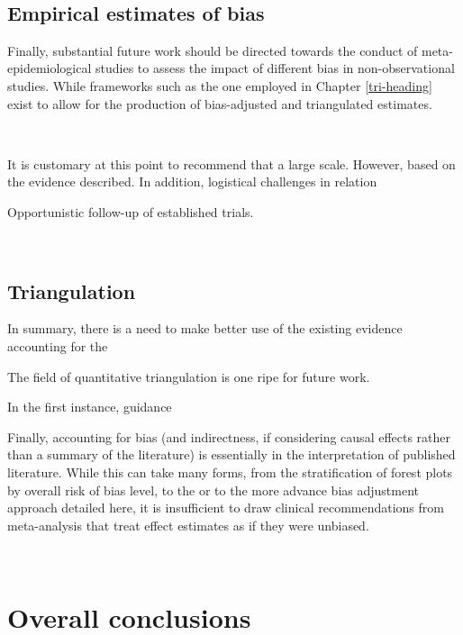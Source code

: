 \documentclass[a4paper, twoside]{templates/ociamthesis}
\begin{document}
~\\
\newpage

\hypertarget{empirical-estimates-of-bias}{%
\subsection{Empirical estimates of bias}\label{empirical-estimates-of-bias}}

Finally, substantial future work should be directed towards the conduct of meta-epidemiological studies to assess the impact of different bias in non-observational studies. While frameworks such as the one employed in Chapter \ref{tri-heading} exist to allow for the production of bias-adjusted and triangulated estimates.

~\\
\newpage

It is customary at this point to recommend that a large scale. However, based on the evidence described. In addition, logistical challenges in relation

Opportunistic follow-up of established trials.

~\\
\newpage

\hypertarget{triangulation}{%
\subsection{Triangulation}\label{triangulation}}

In summary, there is a need to make better use of the existing evidence accounting for the

The field of quantitative triangulation is one ripe for future work.

In the first instance, guidance

Finally, accounting for bias (and indirectness, if considering causal effects rather than a summary of the literature) is essentially in the interpretation of published literature. While this can take many forms, from the stratification of forest plots by overall risk of bias level, to the or to the more advance bias adjustment approach detailed here, it is insufficient to draw clinical recommendations from meta-analysis that treat effect estimates as if they were unbiased.

~
\newpage

\hypertarget{overall-conclusions}{%
\section{Overall conclusions}\label{overall-conclusions}}
\end{document}
